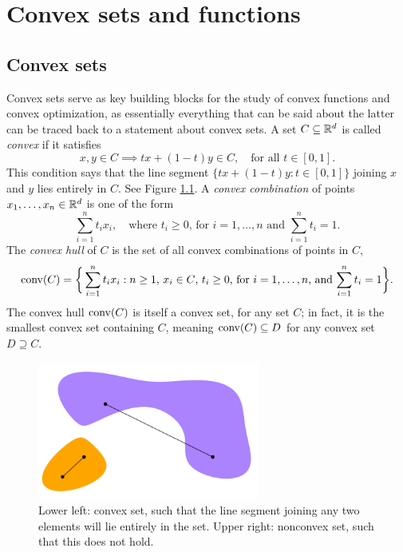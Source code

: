 \chapter{Convex sets and functions}
\label{chap:convex_sets_functions}

\section{Convex sets}  
\label{sec:convex_sets}

Convex sets serve as key building blocks for the study of convex functions and
convex optimization, as essentially everything that can be said about the
latter can be traced back to a statement about convex sets. A set $C \subseteq
\mathbb{R}^d$ is called \emph{convex} if it satisfies   
\begin{equation}
\label{eq:convex_set}
x, y \in C \implies t x + (1-t) y \in C, \quad \text{for all $t \in [0,1]$}. 
\end{equation}
This condition says that the line segment $\{ tx + (1-t) y : t \in [0,1] \}$
joining $x$ and $y$ lies entirely in $C$. See Figure \ref{fig:convex_set}. A
\emph{convex combination} of points $x_1,\ldots,x_n \in \mathbb{R}^d$ is one of the form    
\[
\sum_{i=1}^n t_i x_i, \quad \text{where $t_i \geq 0$, for $i=1,\ldots,n$ and 
  $\sum_{i=1}^n t_i = 1$}. 
\] 
The \emph{convex hull} of $C$ is the set of all convex combinations of points in
$C$, 
\[ 
\operatorname{conv}(C) = \bigg\{
\sum_{i=1}^n t_i x_i : 
\text{$n \geq 1$, $x_i \in C$, $t_i \geq 0$, for $i=1,\ldots,n$, and 
  $\sum_{i=1}^n t_i = 1$} \bigg\}. 
\]
The convex hull $\operatorname{conv}(C)$ is itself a convex set, for any set $C$; in fact, it
is the smallest convex set containing $C$, meaning $\operatorname{conv}(C) \subseteq D$ for 
any convex set $D \supseteq C$. 

\begin{figure}[tb]
\centering
\includegraphics[width=0.65\textwidth]{fig/convex_set.pdf}
\caption{Lower left: convex set, such that the line segment joining any two 
  elements will lie entirely in the set. Upper right: nonconvex set, such
  that this does not hold.} 
\label{fig:convex_set}
\end{figure}

